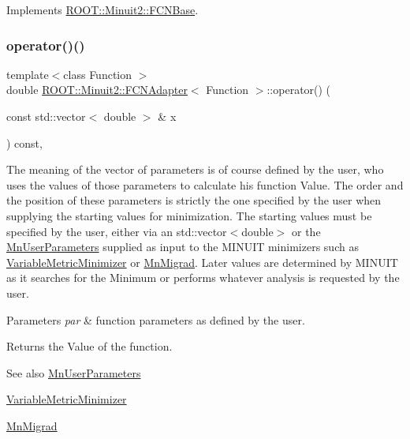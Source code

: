 Implements \mbox{\hyperlink{classROOT_1_1Minuit2_1_1FCNBase_ae4a86bd94d0d0f5ca6fc8f8ab2bb43cd}{R\+O\+O\+T\+::\+Minuit2\+::\+F\+C\+N\+Base}}.

\mbox{\label{classROOT_1_1Minuit2_1_1FCNAdapter_a3d400764a6828594b68a00b905d450b2}} 
\subsubsection{\texorpdfstring{operator()()}{operator()()}\hspace{0.1cm}{\footnotesize\ttfamily [2/6]}}
{\footnotesize\ttfamily template$<$class Function $>$ \\
double \mbox{\hyperlink{classROOT_1_1Minuit2_1_1FCNAdapter}{R\+O\+O\+T\+::\+Minuit2\+::\+F\+C\+N\+Adapter}}$<$ Function $>$\+::operator() (\begin{DoxyParamCaption}\item[{const std\+::vector$<$ double $>$ \&}]{x }\end{DoxyParamCaption}) const\hspace{0.3cm}{\ttfamily [inline]}, {\ttfamily [virtual]}}

The meaning of the vector of parameters is of course defined by the user, who uses the values of those parameters to calculate his function Value. The order and the position of these parameters is strictly the one specified by the user when supplying the starting values for minimization. The starting values must be specified by the user, either via an std\+::vector$<$double$>$ or the \mbox{\hyperlink{classROOT_1_1Minuit2_1_1MnUserParameters}{Mn\+User\+Parameters}} supplied as input to the M\+I\+N\+U\+IT minimizers such as \mbox{\hyperlink{classROOT_1_1Minuit2_1_1VariableMetricMinimizer}{Variable\+Metric\+Minimizer}} or \mbox{\hyperlink{classROOT_1_1Minuit2_1_1MnMigrad}{Mn\+Migrad}}. Later values are determined by M\+I\+N\+U\+IT as it searches for the Minimum or performs whatever analysis is requested by the user.


\begin{DoxyParams}{Parameters}
{\em par} & function parameters as defined by the user.\\
\hline
\end{DoxyParams}
\begin{DoxyReturn}{Returns}
the Value of the function.
\end{DoxyReturn}
\begin{DoxySeeAlso}{See also}
\mbox{\hyperlink{classROOT_1_1Minuit2_1_1MnUserParameters}{Mn\+User\+Parameters}} 

\mbox{\hyperlink{classROOT_1_1Minuit2_1_1VariableMetricMinimizer}{Variable\+Metric\+Minimizer}} 

\mbox{\hyperlink{classROOT_1_1Minuit2_1_1MnMigrad}{Mn\+Migrad}} 
\end{DoxySeeAlso}


